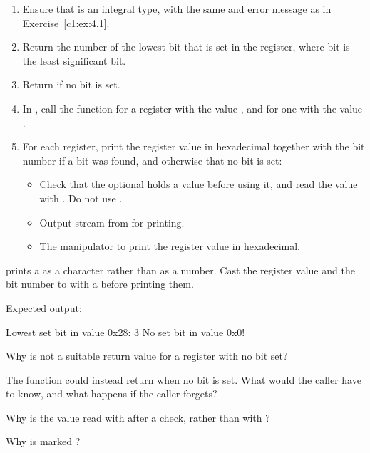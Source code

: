 \begin{enumerate}
  \item Ensure that  is an integral type, with the same  and error
    message as in Exercise~\ref{c1:ex:4.1}.
  \item Return the number of the lowest bit that is set in the register, where bit  is the
    least significant bit.
  \item Return  if no bit is set.
  \item In , call the function for a  register with the value
    , and for one with the value .
  \item For each register, print the register value in hexadecimal together with the bit number
    if a bit was found, and otherwise that no bit is set:
  \begin{itemize}
    \item Check that the optional holds a value before using it, and read the value with
      \code{*}. Do not use .
    \item Output stream  from  for printing.
    \item The manipulator  to print the register value in hexadecimal.
  \end{itemize}
\end{enumerate}
\note {} prints a  as a character rather than as a number. Cast
the register value and the bit number to  with a  before printing
them.

Expected output:

\begin{console}
Lowest set bit in value 0x28: 3
No set bit in value 0x0!
\end{console}

\label{c1:ex:5.2}
\begin{parts}
  \item Why is  not a suitable return value for a register with no bit set?
  \item The function could instead return  when no bit is set. What would the caller
    have to know, and what happens if the caller forgets?
  \item Why is the value read with \code{*} after a check, rather than with ?
  \item Why is  marked \code{[[nodiscard]]}?
\end{parts}
